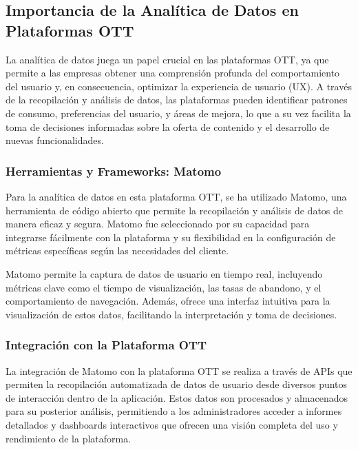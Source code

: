 \subsection{Importancia de la Analítica de Datos en Plataformas OTT}
\label{subsec:fundamentos_analitica_importancia}

La analítica de datos juega un papel crucial en las plataformas OTT, ya que permite a las empresas obtener 
una comprensión profunda del comportamiento del usuario y, en consecuencia, optimizar la experiencia de usuario (UX). 
A través de la recopilación y análisis de datos, las plataformas pueden identificar patrones de consumo, preferencias 
del usuario, y áreas de mejora, lo que a su vez facilita la toma de decisiones informadas sobre la oferta de contenido 
y el desarrollo de nuevas funcionalidades.


\subsubsection{Herramientas y Frameworks: Matomo}
\label{subsubsec:fundamentos_analitica_matomo}

Para la analítica de datos en esta plataforma OTT, se ha utilizado Matomo, una herramienta de código abierto que permite 
la recopilación y análisis de datos de manera eficaz y segura. Matomo fue seleccionado por su capacidad para integrarse 
fácilmente con la plataforma y su flexibilidad en la configuración de métricas específicas según las necesidades del cliente.

Matomo permite la captura de datos de usuario en tiempo real, incluyendo métricas clave como el tiempo de visualización, 
las tasas de abandono, y el comportamiento de navegación. Además, ofrece una interfaz intuitiva para la visualización de 
estos datos, facilitando la interpretación y toma de decisiones.

\subsubsection{Integración con la Plataforma OTT}
\label{subsubsec:fundamentos_analitica_integracion}

La integración de Matomo con la plataforma OTT se realiza a través de APIs que permiten la recopilación automatizada de 
datos de usuario desde diversos puntos de interacción dentro de la aplicación. Estos datos son procesados y almacenados 
para su posterior análisis, permitiendo a los administradores acceder a informes detallados y dashboards interactivos 
que ofrecen una visión completa del uso y rendimiento de la plataforma.

